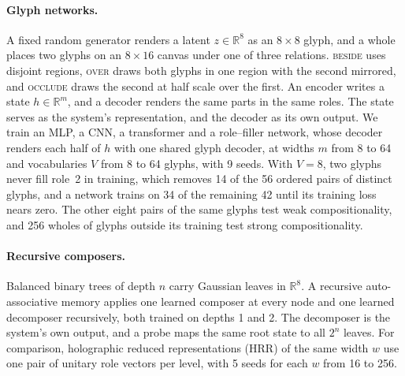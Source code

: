 \documentclass[10pt]{article}
\theoremstyle{plain}
\theoremstyle{remark}
\newcommand{\R}{\mathbb{R}}
\begin{document}
\paragraph{Glyph networks.} A fixed random generator renders a latent $z \in \R^{8}$ as an $8 \times 8$ glyph, and a whole places two glyphs on an $8 \times 16$ canvas under one of three relations. \textsc{beside} uses disjoint regions, \textsc{over} draws both glyphs in one region with the second mirrored, and \textsc{occlude} draws the second at half scale over the first. An encoder writes a state $h \in \R^m$, and a decoder renders the same parts in the same roles. The state serves as the system's representation, and the decoder as its own output. We train an MLP, a CNN, a transformer and a role--filler network, whose decoder renders each half of $h$ with one shared glyph decoder, at widths $m$ from 8 to 64 and vocabularies $V$ from 8 to 64 glyphs, with 9 seeds. With $V = 8$, two glyphs never fill role~2 in training, which removes 14 of the 56 ordered pairs of distinct glyphs, and a network trains on 34 of the remaining 42 until its training loss nears zero. The other eight pairs of the same glyphs test weak compositionality, and 256 wholes of glyphs outside its training test strong compositionality.

\paragraph{Recursive composers.} Balanced binary trees of depth $n$ carry Gaussian leaves in $\R^8$. A recursive auto-associative memory \citep{pollack1990} applies one learned composer at every node and one learned decomposer recursively, both trained on depths 1 and 2. The decomposer is the system's own output, and a probe maps the same root state to all $2^n$ leaves. For comparison, holographic reduced representations (HRR) of the same width $w$ use one pair of unitary role vectors per level, with 5 seeds for each $w$ from 16 to 256.
\end{document}
